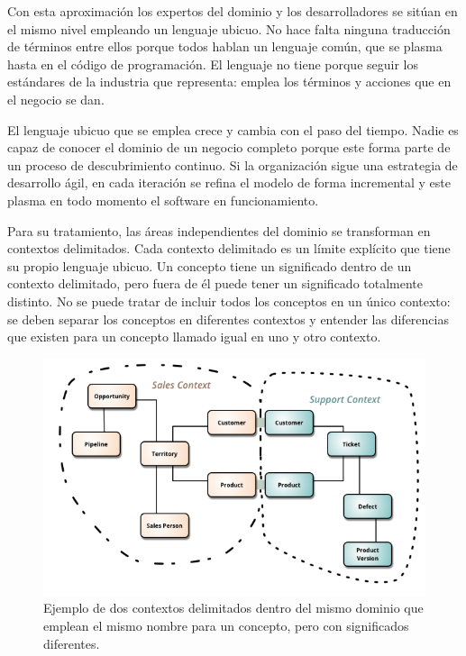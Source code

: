 \documentclass[11pt,spanish,listoffigures]{tfgetsinf}
\begin{document}
Con esta aproximación los expertos del dominio y los desarrolladores se sitúan en el mismo nivel empleando un lenguaje ubicuo. No hace falta ninguna traducción de términos entre ellos porque todos hablan un lenguaje común, que se plasma hasta en el código de programación. El lenguaje no tiene porque seguir los estándares de la industria que representa: emplea los términos y acciones que en el negocio se dan. \cite{Vaughn2013}

El lenguaje ubicuo que se emplea crece y cambia con el paso del tiempo. Nadie es capaz de conocer el dominio de un negocio completo porque este forma parte de un proceso de descubrimiento continuo. Si la organización sigue una estrategia de desarrollo ágil, en cada iteración se refina el modelo de forma incremental y este plasma en todo momento el software en funcionamiento.

Para su tratamiento, las áreas independientes del dominio se transforman en contextos delimitados. Cada contexto delimitado es un límite explícito que tiene su propio lenguaje ubicuo. Un concepto tiene un significado dentro de un contexto delimitado, pero fuera de él puede tener un significado totalmente distinto. No se puede tratar de incluir todos los conceptos en un único contexto: se deben separar los conceptos en diferentes contextos y entender las diferencias que existen para un concepto llamado igual en uno y otro contexto.

\begin{figure}[h]
\centering
\includegraphics[scale=0.8]{bounded_contexts}
\caption{Ejemplo de dos contextos delimitados dentro del mismo dominio que emplean el mismo nombre para un concepto, pero con significados diferentes. \cite{Fowler}}
\label{fig:BoundedContexts}
\end{figure}
\end{document}
